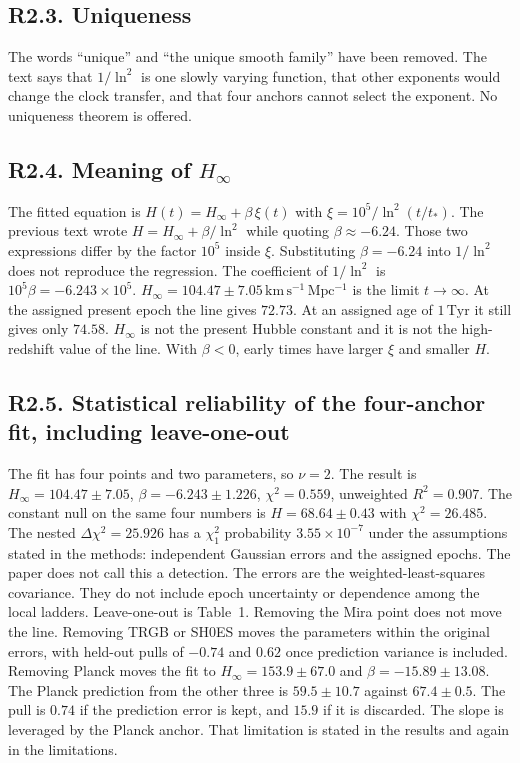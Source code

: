 \documentclass[11pt]{article}
\begin{document}
\subsection*{R2.3. Uniqueness}

The words ``unique'' and ``the unique smooth family'' have been removed.
The text says that $1/\ln^{2}$ is one slowly varying function, that other exponents would change the clock transfer, and that four anchors cannot select the exponent.
No uniqueness theorem is offered.

\subsection*{R2.4. Meaning of $H_{\infty}$}

The fitted equation is $H(t)=H_{\infty}+\beta\,\xi(t)$ with $\xi=10^{5}/\ln^{2}(t/t_{*})$.
The previous text wrote $H=H_{\infty}+\beta/\ln^{2}$ while quoting $\beta\approx-6.24$.
Those two expressions differ by the factor $10^{5}$ inside $\xi$.
Substituting $\beta=-6.24$ into $1/\ln^{2}$ does not reproduce the regression.
The coefficient of $1/\ln^{2}$ is $10^{5}\beta=-6.243\times10^{5}$.
$H_{\infty}=104.47\pm7.05\,\mathrm{km\,s^{-1}\,Mpc^{-1}}$ is the limit $t\to\infty$.
At the assigned present epoch the line gives $72.73$.
At an assigned age of $1\,\mathrm{Tyr}$ it still gives only $74.58$.
$H_{\infty}$ is not the present Hubble constant and it is not the high-redshift value of the line.
With $\beta<0$, early times have larger $\xi$ and smaller $H$.

\subsection*{R2.5. Statistical reliability of the four-anchor fit, including leave-one-out}

The fit has four points and two parameters, so $\nu=2$.
The result is $H_{\infty}=104.47\pm7.05$, $\beta=-6.243\pm1.226$, $\chi^{2}=0.559$, unweighted $R^{2}=0.907$.
The constant null on the same four numbers is $H=68.64\pm0.43$ with $\chi^{2}=26.485$.
The nested $\Delta\chi^{2}=25.926$ has a $\chi^{2}_{1}$ probability $3.55\times10^{-7}$ under the assumptions stated in the methods: independent Gaussian errors and the assigned epochs.
The paper does not call this a detection.
The errors are the weighted-least-squares covariance.
They do not include epoch uncertainty or dependence among the local ladders.
Leave-one-out is Table~1.
Removing the Mira point does not move the line.
Removing TRGB or SH0ES moves the parameters within the original errors, with held-out pulls of $-0.74$ and $0.62$ once prediction variance is included.
Removing Planck moves the fit to $H_{\infty}=153.9\pm67.0$ and $\beta=-15.89\pm13.08$.
The Planck prediction from the other three is $59.5\pm10.7$ against $67.4\pm0.5$.
The pull is $0.74$ if the prediction error is kept, and $15.9$ if it is discarded.
The slope is leveraged by the Planck anchor.
That limitation is stated in the results and again in the limitations.
\end{document}
